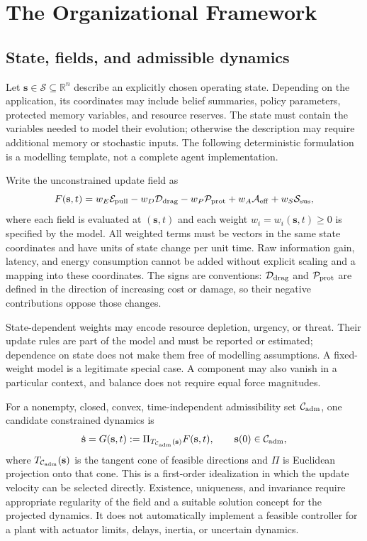 \section{The \uvif{} Organizational Framework}
\label{sec:uvif_framework}

\subsection{State, fields, and admissible dynamics}
Let $\mathbf{s}\in\mathcal{S}\subseteq\mathbb{R}^n$ describe an explicitly chosen operating state. Depending on the application, its coordinates may include belief summaries, policy parameters, protected memory variables, and resource reserves. The state must contain the variables needed to model their evolution; otherwise the description may require additional memory or stochastic inputs. The following deterministic formulation is a modelling template, not a complete agent implementation.

Write the unconstrained update field as
\begin{equation}
 F(\mathbf{s},t)=w_E\mathcal{E}_{\mathrm{pull}}-w_D\mathcal{D}_{\mathrm{drag}}-w_P\mathcal{P}_{\mathrm{prot}}
                   +w_A\mathcal{A}_{\mathrm{eff}}+w_S\mathcal{S}_{\mathrm{sus}},
 \label{eq:uvif_dynamics}
\end{equation}
where each field is evaluated at $(\mathbf{s},t)$ and each weight $w_i=w_i(\mathbf{s},t)\geq0$ is specified by the model. All weighted terms must be vectors in the same state coordinates and have units of state change per unit time. Raw information gain, latency, and energy consumption cannot be added without explicit scaling and a mapping into these coordinates. The signs are conventions: $\mathcal{D}_{\mathrm{drag}}$ and $\mathcal{P}_{\mathrm{prot}}$ are defined in the direction of increasing cost or damage, so their negative contributions oppose those changes.

State-dependent weights may encode resource depletion, urgency, or threat. Their update rules are part of the model and must be reported or estimated; dependence on state does not make them free of modelling assumptions. A fixed-weight model is a legitimate special case. A component may also vanish in a particular context, and balance does not require equal force magnitudes.

For a nonempty, closed, convex, time-independent admissibility set $\mathcal{C}_{\mathrm{adm}}$, one candidate constrained dynamics is
\begin{equation}
 \dot{\mathbf{s}}=G(\mathbf{s},t)
 :=\Pi_{T_{\mathcal{C}_{\mathrm{adm}}}(\mathbf{s})} F(\mathbf{s},t),
 \qquad \mathbf{s}(0)\in\mathcal{C}_{\mathrm{adm}},
 \label{eq:projected}
\end{equation}
where $T_{\mathcal{C}_{\mathrm{adm}}}(\mathbf{s})$ is the tangent cone of feasible directions and $\Pi$ is Euclidean projection onto that cone. This is a first-order idealization in which the update velocity can be selected directly. Existence, uniqueness, and invariance require appropriate regularity of the field and a suitable solution concept for the projected dynamics. It does not automatically implement a feasible controller for a plant with actuator limits, delays, inertia, or uncertain dynamics.

